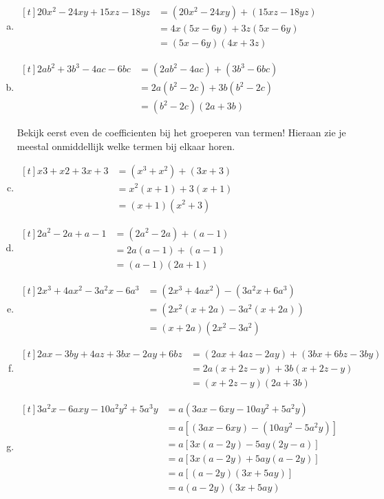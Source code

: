\documentclass[12pt]{article}
\begin{document}
\begin{solution}
\vspace{-2\topsep}
\begin{enumerate}[(a)]
  \item $\begin{aligned}[t]20x^2 - 24xy + 15xz - 18yz
      &= (20x^2 - 24xy) + (15xz - 18yz)\\
			&= 4x (5x - 6y) + 3z (5x - 6y)\\
			&= (5x - 6y) (4x + 3z)
  \end{aligned}$
  \item $\begin{aligned}[t]2ab^2 + 3b^3 - 4ac - 6bc
      &= (2ab^2 - 4ac) + (3b^3 - 6bc)\\
			&= 2a (b^2 - 2c) + 3b (b^2 - 2c)\\
			&= (b^2 - 2c) (2a + 3b) \end{aligned}$
			
			Bekijk eerst even de coefficienten bij het groeperen van termen! Hieraan zie je meestal onmiddellijk welke termen bij elkaar horen.
	\item $\begin{aligned}[t]x3 + x2 + 3x + 3	
	    &= (x^3 + x^2) + (3x + 3)\\
			&= x^2 (x + 1) + 3 (x + 1)\\
			&= (x + 1) (x^2 + 3)
  \end{aligned}$
  \item $\begin{aligned}[t]2a^2 - 2a + a - 1
      &= (2a^2 - 2a) + (a - 1)\\
			&= 2a (a - 1) + (a - 1)\\
			&= (a - 1) (2a + 1)
  \end{aligned}$
  \item $\begin{aligned}[t]2x^3 + 4ax^2 - 3a^2x - 6a^3
      &= (2x^3 + 4ax^2) - (3a^2x + 6a^3)\\
			&= (2x^2 (x + 2a) - 3a^2 (x + 2a))\\
			&= (x + 2a) (2x^2 - 3a^2)
  \end{aligned}$
  \item $\begin{aligned}[t]2ax - 3by + 4az + 3bx - 2ay + 6bz
    &= (2ax + 4az - 2ay) + (3bx + 6bz - 3by)\\
		&= 2a (x + 2z - y) + 3b (x + 2z - y)\\
		&= (x + 2z - y) (2a + 3b)
  \end{aligned}$
  \item $\begin{aligned}[t]3a^2x - 6axy - 10a^2y^2 + 5a^3y
    &= a (3ax - 6xy - 10ay^2 + 5a^2y)\\
		&= a [(3ax - 6xy) - (10ay^2 - 5a^2y)]\\
		&= a [3x (a - 2y) - 5ay (2y - a)]\\
		&= a [3x (a - 2y) + 5ay (a - 2y)]\\
		&= a [(a - 2y) (3x + 5ay)]\\
		&= a (a - 2y) (3x + 5ay)
  \end{aligned}$
		

\end{enumerate}
\end{solution}
\end{document}
